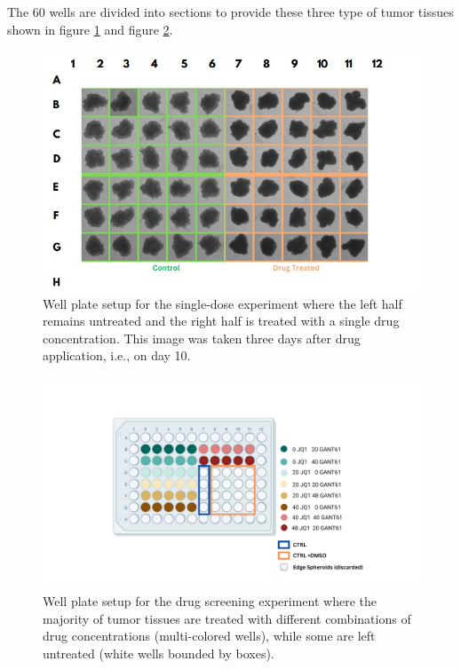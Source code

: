 \documentclass[12pt,twoside,a4paper,parskip]{scrbook} %
\begin{document}
The 60 wells are divided into sections to provide these three type of tumor tissues shown in figure \ref{fig:Single dose wellplate} and figure \ref{fig:Drug screen wellplate}.
\begin{figure}[H]
  \centering
  \includegraphics[width=0.9\linewidth]{figures/singledose.png} %
  \caption{Well plate setup for the single-dose experiment where the left half remains untreated and the right half is treated with a single drug concentration. This image was taken three days after drug application, i.e., on day 10.}
  \label{fig:Single dose wellplate}
\end{figure}

\begin{figure}[H]
  \centering
  \includegraphics[width=1.2\linewidth]{figures/drug_screened.png} %
  \caption{Well plate setup for the drug screening experiment where the majority of tumor tissues are treated with different combinations of drug concentrations (multi-colored wells), while some are left untreated (white wells bounded by boxes).}
  \label{fig:Drug screen wellplate}
\end{figure}
\end{document}
